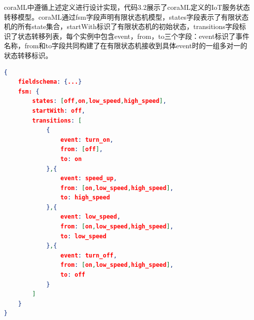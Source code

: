 \documentclass[winfonts,master,twoside]{njuthesis}
\begin{document}
coraML中遵循上述定义进行设计实现，代码3.2展示了coraML定义的IoT服务状态转移模型。coraML通过fsm字段声明有限状态机模型，states字段表示了有限状态机的所有state集合，startWith标识了有限状态机的初始状态，transitions字段标识了状态转移列表，每个实例中包含event，from，to三个字段：event标识了事件名称，from和to字段共同构建了在有限状态机接收到具体event时的一组多对一的状态转移标识。

\begin{lstlisting}[caption={coraML定义的净化器服务的状态转移模型},label={lst:airpurifier_transition_model},language=json,basicstyle=\footnotesize] 
{
    fieldschema: {...}
    fsm: {
        states: [off,on,low_speed,high_speed],
        startWith: off,
        transitions: [
            {
                event: turn_on,
                from: [off],
                to: on
            },{
                event: speed_up,
                from: [on,low_speed,high_speed],
                to: high_speed
            },{
                event: low_speed,
                from: [on,low_speed,high_speed],
                to: low_speed
            },{
                event: turn_off,
                from: [on,low_speed,high_speed],
                to: off
            }
        ]
    }
}
\end{lstlisting}
\end{document}
